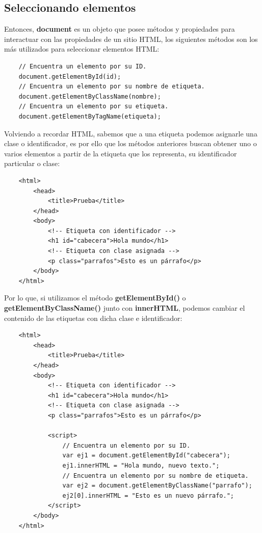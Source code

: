 \subsection{Seleccionando elementos}

Entonces, \textbf{document} es un objeto que posee métodos y propiedades para interactuar con las propiedades de un sitio HTML, los siguientes métodos son los más utilizados para seleccionar elementos HTML:
\begin{lstlisting}
    // Encuentra un elemento por su ID.
    document.getElementById(id);
    // Encuentra un elemento por su nombre de etiqueta.
    document.getElementByClassName(nombre);
    // Encuentra un elemento por su etiqueta.
    document.getElementByTagName(etiqueta);
\end{lstlisting}

Volviendo a recordar HTML, sabemos que a una etiqueta podemos asignarle una clase o identificador, es por ello que los métodos anteriores buscan obtener uno o varios elementos a partir de la etiqueta que los representa, su identificador particular o clase:
\begin{lstlisting}
    <html>
        <head>
            <title>Prueba</title>
        </head>
        <body>
            <!-- Etiqueta con identificador -->
            <h1 id="cabecera">Hola mundo</h1>
            <!-- Etiqueta con clase asignada -->
            <p class="parrafos">Esto es un párrafo</p>
        </body>
    </html>
\end{lstlisting}

Por lo que, si utilizamos el método \textbf{getElementById()} o \textbf{getElementByClassName()} junto con \textbf{innerHTML}, podemos cambiar el contenido de las etiquetas con dicha clase e identificador:
\begin{lstlisting}
    <html>
        <head>
            <title>Prueba</title>
        </head>
        <body>
            <!-- Etiqueta con identificador -->
            <h1 id="cabecera">Hola mundo</h1>
            <!-- Etiqueta con clase asignada -->
            <p class="parrafos">Esto es un párrafo</p>
            
            <script>
                // Encuentra un elemento por su ID.
                var ej1 = document.getElementById("cabecera");
                ej1.innerHTML = "Hola mundo, nuevo texto.";
                // Encuentra un elemento por su nombre de etiqueta.
                var ej2 = document.getElementByClassName("parrafo");
                ej2[0].innerHTML = "Esto es un nuevo párrafo.";
            </script>
        </body>
    </html>
\end{lstlisting}

